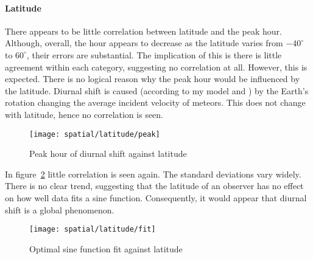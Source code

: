 \paragraph{Latitude\\}
There appears to be little correlation between latitude and the peak hour. Although, overall, the hour appears to decrease as the latitude varies from $-40^{\circ}$ to $60^{\circ}$, their errors are substantial. The implication of this is there is little agreement within each category, suggesting no correlation at all. However, this is expected. There is no logical reason why the peak hour would be influenced by the latitude. Diurnal shift is caused (according to my model and \cite{baa}) by the Earth's rotation changing the average incident velocity of meteors. This does not change with latitude, hence no correlation is seen.
\begin{figure}[h!]
	\centering
	\texttt{[image: spatial/latitude/peak]}
	\caption{Peak hour of diurnal shift against latitude
		\label{fig:dishift:lat:peak}}
\end{figure}

In figure~\ref{fig:dishift:lat:fit} little correlation is seen again. The standard deviations vary widely. There is no clear trend, suggesting that the latitude of an observer has no effect on how well data fits a sine function. Consequently, it would appear that diurnal shift is a global phenomenon.
\begin{figure}[h!]
	\centering
	\texttt{[image: spatial/latitude/fit]}
	\caption{Optimal sine function fit against latitude
		\label{fig:dishift:lat:fit}}
\end{figure}

